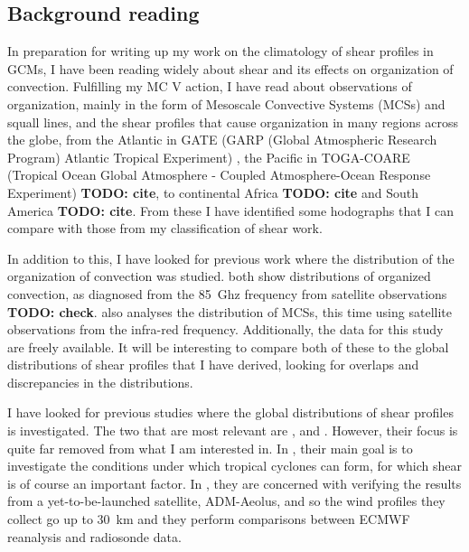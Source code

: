 \documentclass[11pt,a4paper]{article}
\newcommand\todo[1]{\textbf{TODO: #1}}
\begin{document}
\subsection{Background reading}
\label{sec:Background reading}

In preparation for writing up my work on the climatology of shear profiles in GCMs, I have been reading widely about shear and its effects on organization of convection. Fulfilling my MC V action, I have read about observations of organization, mainly in the form of Mesoscale Convective Systems (MCSs) and squall lines, and the shear profiles that cause organization in many regions across the globe, from the Atlantic in GATE (GARP (Global Atmospheric Research Program) Atlantic Tropical Experiment) \parencite{houze1977structure, zipser1977}, the Pacific in TOGA-COARE (Tropical Ocean Global Atmosphere - Coupled Atmosphere-Ocean Response Experiment) \todo{cite}, to continental Africa \todo{cite} and South America \todo{cite}. From these I have identified some hodographs that I can compare with those from my classification of shear work. 

In addition to this, I have looked for previous work where the distribution of the organization of convection was studied. \cite{mohr1966mesoscale, mohr1999contribution} both show distributions of organized convection, as diagnosed from the \SI{85}{Ghz} frequency from satellite observations \todo{check}. \cite{huang2018longterm} also analyses the distribution of MCSs, this time using satellite observations from the infra-red frequency. Additionally, the data for this study are freely available. It will be interesting to compare both of these to the global distributions of shear profiles that I have derived, looking for overlaps and discrepancies in the distributions.

I have looked for previous studies where the global distributions of shear profiles is investigated. The two that are most relevant are \cite{aiyyer2006climatology}, and \cite{houchi2010comparison}. However, their focus is quite far removed from what I am interested in. In \cite{aiyyer2006climatology}, their main goal is to investigate the conditions under which tropical cyclones can form, for which shear is of course an important factor. In \cite{houchi2010comparison}, they are concerned with verifying the results from a yet-to-be-launched satellite, ADM-Aeolus, and so the wind profiles they collect go up to \SI{30}{km} and they perform comparisons between ECMWF reanalysis and radiosonde data. 
\end{document}
